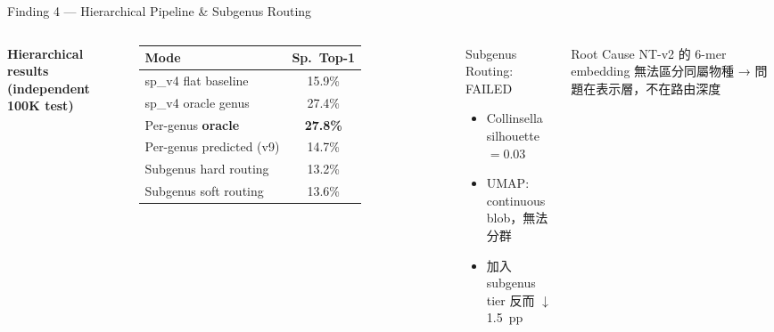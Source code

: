 \documentclass[aspectratio=169,12pt]{beamer}
\begin{document}
\begin{frame}{Finding 4 — Hierarchical Pipeline \& Subgenus Routing}
\begin{columns}
\textbf{Hierarchical results (independent 100K test)}\\[6pt]
\begin{tabular}{lc}
\toprule
Mode & Sp.\ Top-1 \\
\midrule
sp\_v4 flat baseline       & 15.9\% \\
sp\_v4 oracle genus        & 27.4\% \\
Per-genus \textbf{oracle}  & \textbf{27.8\%} \\
Per-genus predicted (v9)   & 14.7\% \\
\midrule
Subgenus hard routing      & 13.2\% \\
Subgenus soft routing      & 13.6\% \\
\bottomrule
\end{tabular}

\begin{alertblock}{Subgenus Routing: FAILED}
\begin{itemize}
  \item Collinsella silhouette $= 0.03$
  \item UMAP: continuous blob，無法分群
  \item 加入 subgenus tier 反而 $\downarrow$ 1.5~pp
\end{itemize}
\end{alertblock}

\vspace{6pt}
\begin{block}{Root Cause}
NT-v2 的 6-mer embedding 無法區分同屬物種 → 問題在表示層，不在路由深度
\end{block}
\end{columns}
\end{frame}
\end{document}
